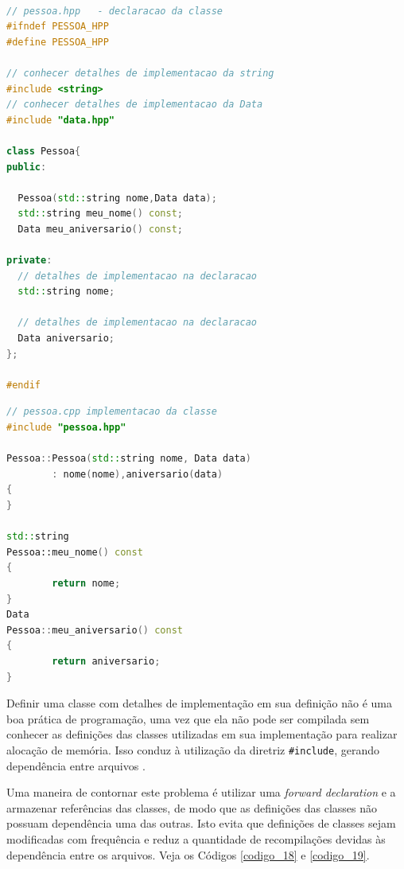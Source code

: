 \begin{lstlisting}[language=C++,caption={ 
                                 Declaração da classe Pessoa},
                                                label=codigo_16]

// pessoa.hpp   - declaracao da classe
#ifndef PESSOA_HPP
#define PESSOA_HPP

// conhecer detalhes de implementacao da string
#include <string>       
// conhecer detalhes de implementacao da Data
#include "data.hpp"     

class Pessoa{
public:

  Pessoa(std::string nome,Data data);
  std::string meu_nome() const;
  Data meu_aniversario() const;

private:
  // detalhes de implementacao na declaracao
  std::string nome;        

  // detalhes de implementacao na declaracao
  Data aniversario;        
};

#endif

\end{lstlisting}

\begin{lstlisting}[language=C++,caption={
                                        Definição da classe Pessoa},
                                                    label=codigo_17]
// pessoa.cpp implementacao da classe
#include "pessoa.hpp"

Pessoa::Pessoa(std::string nome, Data data)
        : nome(nome),aniversario(data)
{
}

std::string
Pessoa::meu_nome() const
{
        return nome;
}
Data
Pessoa::meu_aniversario() const
{
        return aniversario;
}

\end{lstlisting}    


Definir uma classe com detalhes de implementação em sua definição não é uma
 boa prática de programação, uma vez que ela não pode ser compilada sem
 conhecer as definições das classes utilizadas em sua implementação para
 realizar alocação de memória. Isso conduz à utilização da diretriz
 \texttt{\#include}, gerando dependência entre arquivos \cite[pág. 140]{ref44}.

Uma maneira de contornar este problema é utilizar uma \textit{forward declaration} e a
 armazenar referências das classes, de modo que as definições das classes não
 possuam dependência uma das outras. Isto evita que definições de classes sejam
 modificadas com frequência e reduz a quantidade de recompilações devidas às
 dependência entre os  arquivos. Veja os Códigos \ref{codigo_18} 
e \ref{codigo_19}.


